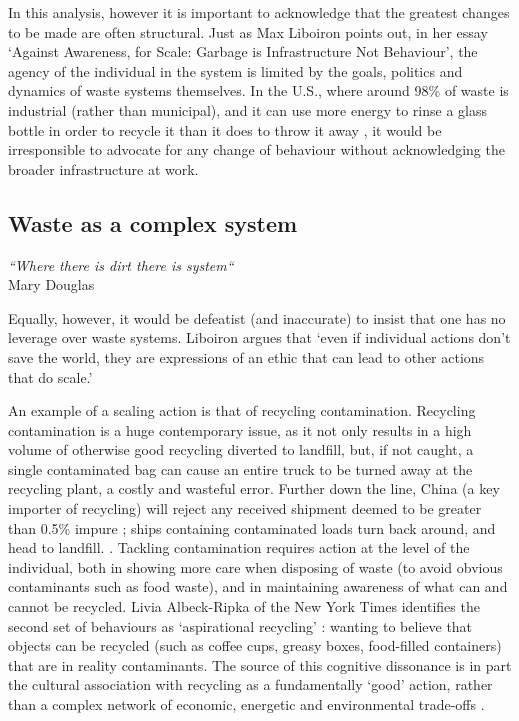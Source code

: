 \documentclass[nofonts,nols,justified,nobib]{tufte-book}
\begin{document}
In this analysis, however it is important to acknowledge that the greatest changes to be made are often structural. Just as Max Liboiron points out, in her essay `Against Awareness, for Scale: Garbage is Infrastructure Not Behaviour', the agency of the individual in the system is limited by the goals, politics and dynamics of waste systems themselves. In the U.S., where around 98\% of waste is industrial (rather than municipal)\cite{liboiron_against_2014}, and it can use more energy to rinse a glass bottle in order to recycle it than it does to throw it away \cite{tierney_reign_2018}, it would be irresponsible to advocate for any change of behaviour without acknowledging the broader infrastructure at work.

\subsection*{Waste as a complex system}

\begin{flushright}
\emph{``Where there is dirt there is system``} \cite{douglas_purity_1966}\\
Mary Douglas 
\end{flushright}

Equally, however, it would be defeatist (and inaccurate) to insist that one has no leverage over waste systems. Liboiron argues that `even if individual actions don't save the world, they are expressions of an ethic that can lead to other actions that do scale.'\cite{liboiron_against_2014}

An example of a scaling action is that of recycling contamination. Recycling contamination is a huge contemporary issue, as it not only results in a high volume of otherwise good recycling diverted to landfill, but, if not caught, a single contaminated bag can cause an entire truck to be turned away at the recycling plant, a costly and wasteful error. Further down the line, China (a key importer of recycling) will reject any received shipment deemed to be greater than 0.5\% impure \cite{casella_recycle_2018}; ships containing contaminated loads turn back around, and head to landfill. \cite{albeck-ripka_your_2018}. Tackling contamination requires action at the level of the individual, both in showing more care when disposing of waste (to avoid obvious contaminants such as food waste), and in maintaining awareness of what can and cannot be recycled. Livia Albeck-Ripka of the New York Times identifies the second set of behaviours as `aspirational recycling' \cite{albeck-ripka_6_2018}: wanting to believe that objects can be recycled (such as coffee cups, greasy boxes, food-filled containers) that are in reality contaminants. The source of this cognitive dissonance is in part the cultural association with recycling as a fundamentally `good' action, rather than a complex network of economic, energetic and environmental trade-offs \cite{tierney_reign_2018}.
\end{document}
